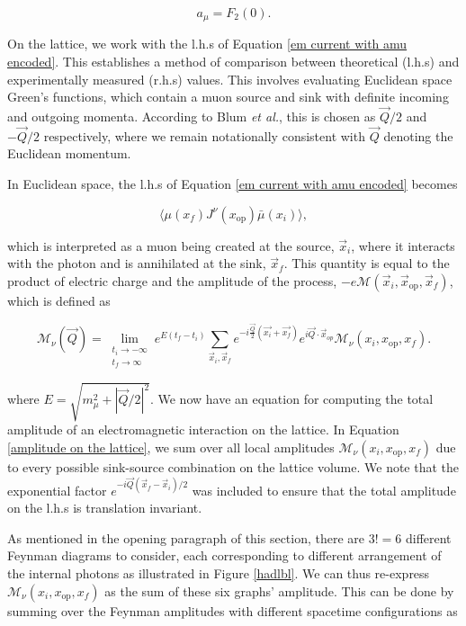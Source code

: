 \documentclass{article}
\numberwithin{equation}{section} %
\begin{document}
\begin{equation}
a_\mu = F_2(0).
\label{amu=f2}
\end{equation}

On the lattice, we work with the l.h.s of Equation \ref{em current with amu encoded}. This establishes a method of comparison between theoretical (l.h.s) and experimentally measured (r.h.s) values. This involves evaluating Euclidean space Green's functions, which contain a muon source and sink with definite incoming and outgoing momenta. According to Blum \textit{et al.}\cite{blum}, this is chosen as $\vec{Q}/2$ and $-\vec{Q}/2$ respectively, where we remain notationally consistent with $\vec{Q}$ denoting the Euclidean momentum. 

In Euclidean space, the l.h.s of Equation \ref{em current with amu encoded} becomes

\begin{equation}
\langle \mu(x_f) J^\nu(x_\mathrm{op}) \bar{\mu}(x_i)\rangle,
\end{equation}

\noindent which is interpreted as a muon being created at the source, $\vec{x}_i$, where it interacts with the photon and is annihilated at the sink, $\vec{x}_f$. This quantity is equal to the product of electric charge and the amplitude of the process, $-e\mathcal{M}(\vec{x}_i,\vec{x}_\mathrm{op},\vec{x}_f)$, which is defined as

\begin{equation}
\mathcal{M}_\nu(\vec{Q}) = \lim_{\substack{t_i\rightarrow -\infty\\t_f \rightarrow \infty}} e^{E(t_f-t_i)} \sum_{\vec{x}_i,\vec{x}_f}e^{-i\frac{\vec{Q}}{2}(\vec{x_i}+\vec{x_f})}e^{i\vec{Q}\cdot\vec{x}_{op}} \mathcal{M}_\nu(x_i,x_\mathrm{op}, x_f).
\label{amplitude on the lattice}
\end{equation}

\noindent where $E=\sqrt{m_\mu^2+|\vec{Q}/2|^2}$. We now have an equation for computing the total amplitude of an electromagnetic interaction on the lattice. In Equation \ref{amplitude on the lattice}, we sum over all local amplitudes $\mathcal{M}_\nu(x_i,x_{\mathrm{op}},x_f)$ due to every possible sink-source combination on the lattice volume. We note that the exponential factor $e^{-i\vec{Q}(\vec{x}_f-\vec{x}_i)/2}$ was included to ensure that the total amplitude on the l.h.s is translation invariant. 

As mentioned in the opening paragraph of this section, there are $3!=6$ different Feynman diagrams to consider, each corresponding to different arrangement of the internal photons as illustrated in Figure \ref{hadlbl}. We can thus re-express $\mathcal{M}_\nu(x_i,x_\mathrm{op},x_f)$ as the sum of these six graphs' amplitude. This can be done by summing over the Feynman amplitudes with different spacetime configurations as
\end{document}
